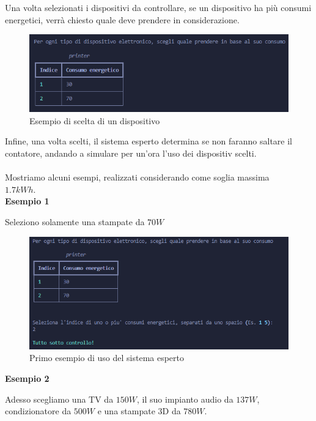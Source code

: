 \documentclass[12pt, letterpaper]{article}
\begin{document}
\noindent Una volta selezionati i dispositivi da controllare, se un dispositivo ha più consumi energetici,
verrà chiesto quale deve prendere in considerazione.


\begin{figure}[h]
      \centering
      \includegraphics[scale=0.8]{printer-choose.png}
      \caption{Esempio di scelta di un dispositivo}
\end{figure}

\noindent Infine, una volta scelti, il sistema esperto determina se non faranno saltare il
contatore, andando a simulare per un'ora l'uso dei dispositiv scelti. \\ \\
Mostriamo alcuni esempi, realizzati considerando come soglia massima \\ $1.7kWh$. \\

\noindent \textbf{Esempio 1}

\noindent Seleziono solamente una stampate da $70W$

\begin{figure}[h]
      \centering
      \includegraphics[scale=0.70]{sistema-esperto-esempio-1.png}
      \caption{Primo esempio di uso del sistema esperto}
\end{figure}

\noindent \textbf{Esempio 2}

\noindent Adesso scegliamo una TV da $150W$, il suo impianto audio da $137W$, condizionatore da $500W$ e una
stampate 3D da $780W$.
\end{document}
